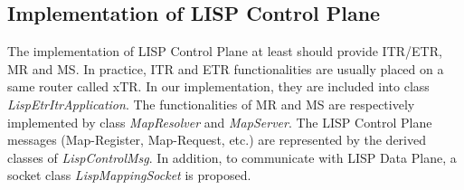 \subsection{Implementation of LISP Control Plane}
\label{subsec:control-plane-impl}
The implementation of LISP Control Plane at least should provide ITR/ETR, MR and MS. In practice, ITR and ETR functionalities are usually placed on a same router called xTR. In our implementation, they are included into class \emph{LispEtrItrApplication}. The functionalities of MR and MS are respectively implemented by class \emph{MapResolver} and \emph{MapServer}. The LISP Control Plane messages (Map-Register, Map-Request, etc.) are represented by the derived classes of \emph{LispControlMsg}. In addition, to communicate with LISP Data Plane, a socket class \emph{LispMappingSocket} is proposed.

